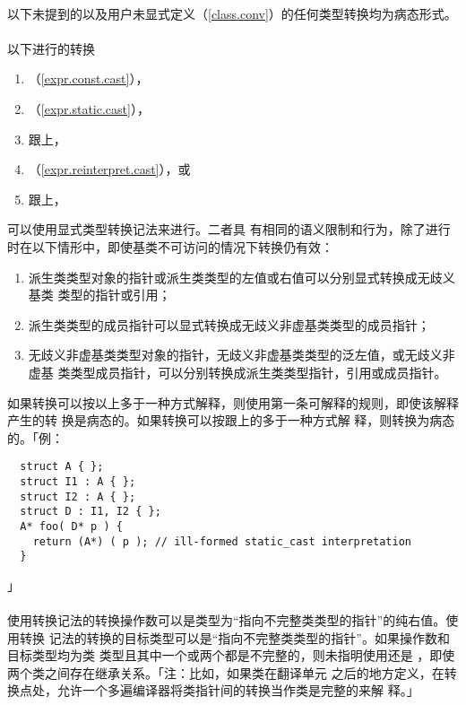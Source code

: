 
\paragraph{}
以下未提到的以及用户未显式定义（\ref{class.conv}）的任何类型转换均为病态形式。

\paragraph{}
以下进行的转换
\begin{enumerate}
  \item{（\ref{expr.const.cast}），}
  \item{（\ref{expr.static.cast}），}
  \item{跟上，}
  \item{（\ref{expr.reinterpret.cast}），或}
  \item{跟上，}
\end{enumerate}
可以使用显式类型转换记法来进行。二者具 有相同的语义限制和行为，除了进行
时在以下情形中，即使基类不可访问的情况下转换仍有效：
\begin{enumerate}
  \item{派生类类型对象的指针或派生类类型的左值或右值可以分别显式转换成无歧义基类
    类型的指针或引用；}
  \item{派生类类型的成员指针可以显式转换成无歧义非虚基类类型的成员指针；}
  \item{无歧义非虚基类类型对象的指针，无歧义非虚基类类型的泛左值，或无歧义非虚基
    类类型成员指针，可以分别转换成派生类类型指针，引用或成员指针。}
\end{enumerate}
如果转换可以按以上多于一种方式解释，则使用第一条可解释的规则，即使该解释产生的转
换是病态的。如果转换可以按跟上的多于一种方式解
释，则转换为病态的。「例：
\begin{lstlisting}
  struct A { };
  struct I1 : A { };
  struct I2 : A { };
  struct D : I1, I2 { };
  A* foo( D* p ) {
    return (A*) ( p ); // ill-formed static_cast interpretation
  }
\end{lstlisting}」

\paragraph{}
使用转换记法的转换操作数可以是类型为``指向不完整类类型的指针''的纯右值。使用转换
记法的转换的目标类型可以是``指向不完整类类型的指针''。如果操作数和目标类型均为类
类型且其中一个或两个都是不完整的，则未指明使用还是
，即使两个类之间存在继承关系。「注：比如，如果类在翻译单元
之后的地方定义，在转换点处，允许一个多遍编译器将类指针间的转换当作类是完整的来解
释。」

